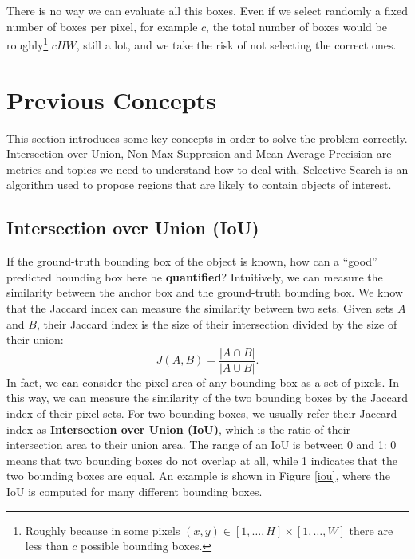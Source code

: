 There is no way we can evaluate all this boxes. Even if we select randomly a fixed number of boxes per pixel, for example $c$, the total number of boxes would be roughly\footnote{Roughly because in some pixels $(x,y) \in [1, \ldots, H]\times [1, \ldots, W]$ there are less than $c$ possible bounding boxes.} $cHW$, still a lot, and we take the risk of not selecting the correct ones.



\section{Previous Concepts}

This section introduces some key concepts in order to solve the problem correctly. Intersection over Union, Non-Max Suppresion and Mean Average Precision are metrics and topics we need to understand how to deal with. Selective Search is an algorithm used to propose regions that are likely to contain objects of interest.

\subsection{Intersection over Union (IoU)}

If the ground-truth bounding box of the object is known, how can a ``good'' predicted bounding box here be \textbf{quantified}? Intuitively, we can measure the similarity between the anchor box and the ground-truth bounding box. We know that the Jaccard index can measure the similarity between two sets. Given sets $A$ and $B$, their Jaccard index is the size of their intersection divided by the size of their union:
$$J(A, B)=\dfrac{|A\cap B|}{|A\cup B|}.$$
In fact, we can consider the pixel area of any bounding box as a set of pixels. In this way, we can measure the similarity of the two bounding boxes by the Jaccard index of their pixel sets. For two bounding boxes, we usually refer their Jaccard index as \textbf{Intersection over Union (IoU)}, which is the ratio of their intersection area to their union area. The range of an IoU is between 0 and 1: 0 means that two bounding boxes do not overlap at all, while 1 indicates that the two bounding boxes are equal. An example is shown in Figure \ref{iou}, where the IoU is computed for many different bounding boxes.



